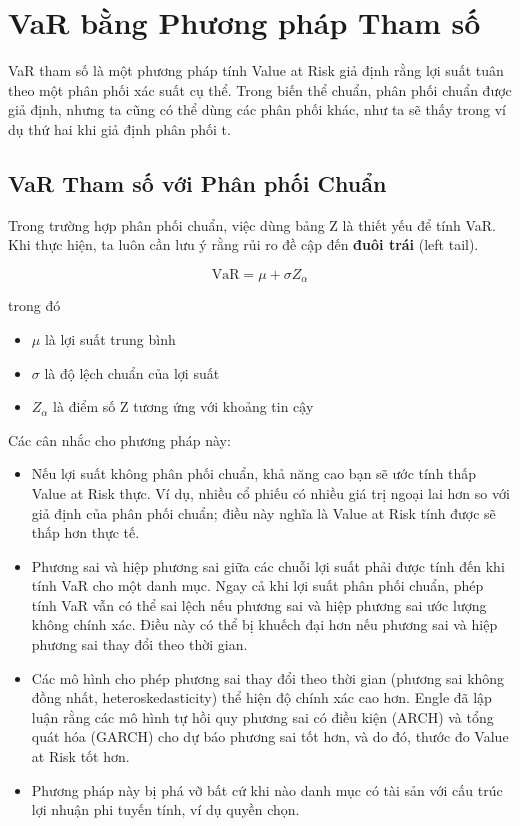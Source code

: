 
\section{VaR bằng Phương pháp Tham số}

VaR tham số là một phương pháp tính Value at Risk giả định rằng lợi suất tuân theo một phân phối xác suất cụ thể. Trong biến thể chuẩn, phân phối chuẩn được giả định, nhưng ta cũng có thể dùng các phân phối khác, như ta sẽ thấy trong ví dụ thứ hai khi giả định phân phối t.

\subsection{VaR Tham số với Phân phối Chuẩn}

Trong trường hợp phân phối chuẩn, việc dùng bảng Z là thiết yếu để tính VaR. Khi thực hiện, ta luôn cần lưu ý rằng rủi ro đề cập đến \textbf{đuôi trái} (left tail).

$$
\text{VaR} = \mu + \sigma Z_{\alpha}
$$

trong đó
\begin{itemize}
  \item $\mu$ là lợi suất trung bình
  \item $\sigma$ là độ lệch chuẩn của lợi suất
  \item $Z_{\alpha}$ là điểm số Z tương ứng với khoảng tin cậy
\end{itemize}

Các cân nhắc cho phương pháp này:

\begin{itemize}
  \item Nếu lợi suất không phân phối chuẩn, khả năng cao bạn sẽ ước tính thấp Value at Risk thực. Ví dụ, nhiều cổ phiếu có nhiều giá trị ngoại lai hơn so với giả định của phân phối chuẩn; điều này nghĩa là Value at Risk tính được sẽ thấp hơn thực tế.
  \item Phương sai và hiệp phương sai giữa các chuỗi lợi suất phải được tính đến khi tính VaR cho một danh mục. Ngay cả khi lợi suất phân phối chuẩn, phép tính VaR vẫn có thể sai lệch nếu phương sai và hiệp phương sai ước lượng không chính xác. Điều này có thể bị khuếch đại hơn nếu phương sai và hiệp phương sai thay đổi theo thời gian.
  \item Các mô hình cho phép phương sai thay đổi theo thời gian (phương sai không đồng nhất, heteroskedasticity) thể hiện độ chính xác cao hơn. Engle đã lập luận rằng các mô hình tự hồi quy phương sai có điều kiện (ARCH) và tổng quát hóa (GARCH) cho dự báo phương sai tốt hơn, và do đó, thước đo Value at Risk tốt hơn.
  \item Phương pháp này bị phá vỡ bất cứ khi nào danh mục có tài sản với cấu trúc lợi nhuận phi tuyến tính, ví dụ quyền chọn.
\end{itemize}

